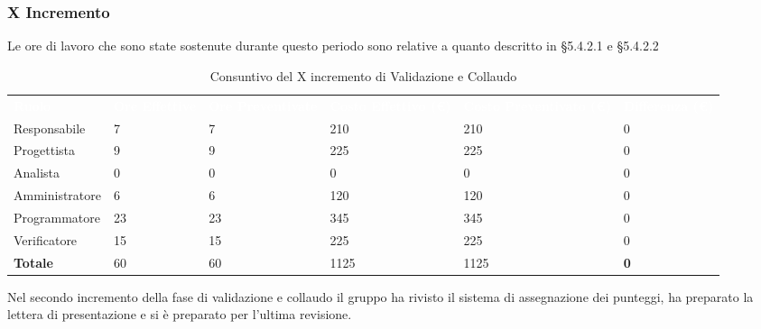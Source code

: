 \pagebreak

\subsubsection{X Incremento}
Le ore di lavoro che sono state sostenute durante questo periodo sono relative a quanto descritto in §5.4.2.1 e §5.4.2.2

\begin{table}[H]
\begin{center}
\renewcommand{\arraystretch}{1.5}
\begin{tabular}{ m{}<{\centering}  m{}<{\centering} m{}<{\centering} m{}<{\centering} m{}<{\centering} m{}<{\centering}}
	\rowcolor{darkblue}
	\textcolor{white}{\textbf{Ruolo}} & \textcolor{white}{\textbf{Ore Effettive}} & \textcolor{white}{\textbf{Ore Preventivate}}&\textcolor{white}{\textbf{Costo Effettivo (\euro)}}&\textcolor{white}{\textbf{Costo Preventivato (\euro)}}&\textcolor{white}{\textbf{Differenza (\euro)}}\\ 

	Responsabile  & 7 & 7 & 210 & 210 & 0\\	
	
	Progettista & 9 & 9 & 225 & 225 & 0\\
	
	Analista & 0 & 0 & 0 & 0 & 0\\
	
	Amministratore & 6 & 6 & 120 & 120 & 0\\
	
	Programmatore & 23 & 23 & 345 & 345 & 0\\
	
	Verificatore & 15 & 15 & 225 & 225 & 0\\
	
	\textbf{Totale} & 60 & 60 & 1125 & 1125 & \textbf{0} \\
	
\end{tabular}
\caption{Consuntivo del X incremento di Validazione e Collaudo}
\end{center}
\end{table}

Nel secondo incremento della fase di validazione e collaudo il gruppo ha rivisto il sistema di assegnazione dei punteggi, ha preparato la lettera di presentazione e si è preparato per l'ultima revisione.

